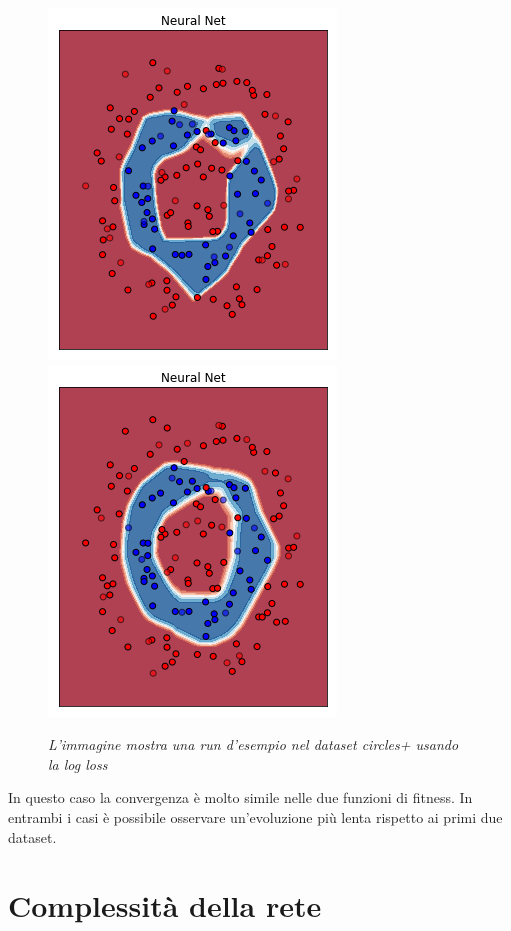 \documentclass[12pt,a4paper]{report}
\begin{document}
\begin{figure}[H]
 \includegraphics[scale = 0.35]{images/circle+-rnd-log./10}
 \includegraphics[scale = 0.35]{images/circle+-rnd-log./11}
 \caption{\textit{L'immagine mostra una run d'esempio nel dataset circles+ usando la log loss}}
 \label{circles+2}
\end{figure}

In questo caso la convergenza è molto simile nelle due funzioni di fitness.
In entrambi i casi è possibile osservare un'evoluzione più lenta rispetto ai primi due dataset.

\section{Complessità della rete} 
\end{document}
